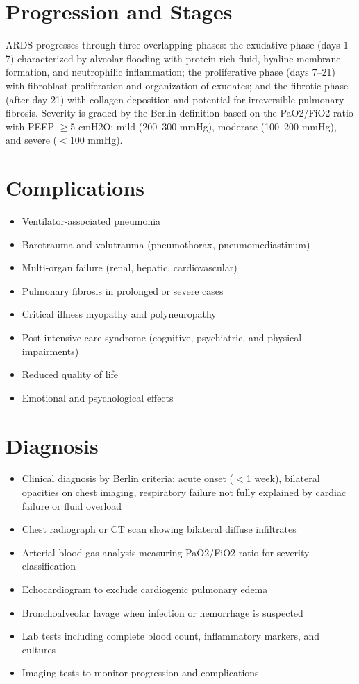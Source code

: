 \section{Progression and Stages}
ARDS progresses through three overlapping phases: the exudative phase (days 1--7) characterized by alveolar flooding with protein-rich fluid, hyaline membrane formation, and neutrophilic inflammation; the proliferative phase (days 7--21) with fibroblast proliferation and organization of exudates; and the fibrotic phase (after day 21) with collagen deposition and potential for irreversible pulmonary fibrosis. Severity is graded by the Berlin definition based on the PaO2/FiO2 ratio with PEEP $\ge$5 cmH2O: mild (200--300 mmHg), moderate (100--200 mmHg), and severe ($<$100 mmHg).

\section{Complications}

\begin{itemize}[noitemsep]
  \item Ventilator-associated pneumonia
  \item Barotrauma and volutrauma (pneumothorax, pneumomediastinum)
  \item Multi-organ failure (renal, hepatic, cardiovascular)
  \item Pulmonary fibrosis in prolonged or severe cases
  \item Critical illness myopathy and polyneuropathy
  \item Post-intensive care syndrome (cognitive, psychiatric, and physical impairments)
  \item Reduced quality of life
  \item Emotional and psychological effects
\end{itemize}

\section{Diagnosis}

\begin{itemize}[noitemsep]
  \item Clinical diagnosis by Berlin criteria: acute onset ($<$1 week), bilateral opacities on chest imaging, respiratory failure not fully explained by cardiac failure or fluid overload
  \item Chest radiograph or CT scan showing bilateral diffuse infiltrates
  \item Arterial blood gas analysis measuring PaO2/FiO2 ratio for severity classification
  \item Echocardiogram to exclude cardiogenic pulmonary edema
  \item Bronchoalveolar lavage when infection or hemorrhage is suspected
  \item Lab tests including complete blood count, inflammatory markers, and cultures
  \item Imaging tests to monitor progression and complications
\end{itemize}

